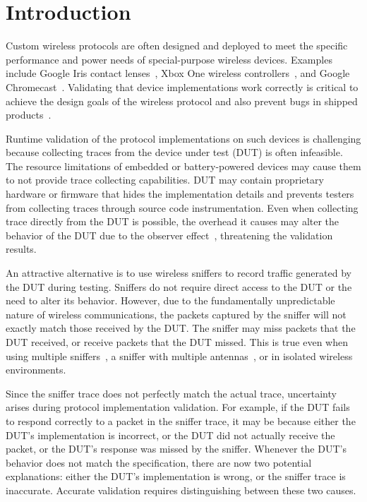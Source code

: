 
\section{Introduction}
\label{sec:intro}

Custom wireless protocols are often designed and deployed to meet the specific
performance and power needs of special-purpose wireless devices. Examples
include Google
Iris contact lenses~\cite{iris}, Xbox One wireless controllers~\cite{xbox}, and
Google Chromecast~\cite{chromecast}. Validating that device implementations work
correctly is critical to achieve the design goals of the wireless protocol and
also prevent bugs in shipped products~\cite{wifried,lollipop,surface}.


Runtime validation of the protocol implementations on such devices is
challenging because collecting traces from the device under test (DUT) is often
infeasible. The resource limitations of embedded or battery-powered devices may
cause them to not provide trace collecting capabilities. DUT may contain
proprietary hardware or firmware that hides the implementation details and
prevents testers from collecting traces through source code instrumentation.
Even when collecting trace directly from the DUT is possible, the overhead it causes
may alter the behavior of the DUT due to the observer
effect~\cite{mytkowicz2008observer}, threatening the validation results.

An attractive alternative is to use wireless
sniffers to record traffic generated by the DUT during testing.
Sniffers do not require direct access to the DUT or the need to alter its behavior.
However, due to the fundamentally unpredictable nature of wireless
communications, the packets captured by the sniffer will not exactly match
those received by the DUT.
The sniffer may miss packets that the DUT received, or receive packets that
the DUT missed.
This is true even when using multiple
sniffers~\cite{cheng2006jigsaw,mahajan2006analyzing,bahl2006enhancing}, a sniffer
with multiple antennas~\cite{omnipeek}, or in isolated wireless environments.

Since the sniffer trace does not perfectly match the actual trace, uncertainty
arises during protocol implementation validation.  For example, if the DUT fails
to respond correctly to a packet in the sniffer trace, it may be because either the
DUT's implementation is incorrect, or the DUT did not actually receive the
packet, or the DUT's response was missed by the sniffer.  Whenever the DUT's
behavior does not match the specification, there are now two potential
explanations: either the DUT's implementation is wrong, or the sniffer trace is
inaccurate. Accurate validation requires  distinguishing between these two
causes.

